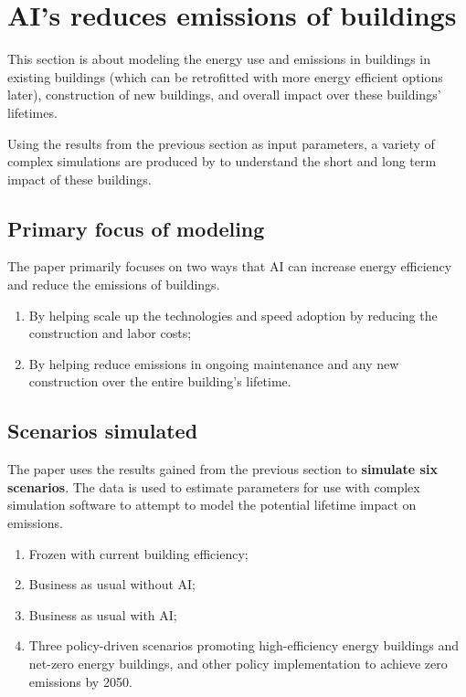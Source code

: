 \documentclass[conference,a4paper]{IEEEtran}
\begin{document}
\section*{AI's reduces emissions of buildings}

This section is about modeling the energy use and emissions in buildings in existing buildings (which can be retrofitted with more energy efficient options later), construction of new buildings, and overall impact over these buildings' lifetimes.

Using the results from the previous section as input parameters, a variety of complex simulations are produced by to understand the short and long term impact of these buildings.

\subsection*{Primary focus of modeling}

The paper primarily focuses on two ways that AI can increase energy efficiency and reduce the emissions of buildings.

\begin{enumerate}
    \item By helping scale up the technologies and speed adoption by reducing the construction and labor costs;
    \item By helping reduce emissions in ongoing maintenance and any new construction over the entire building's lifetime.
\end{enumerate}

\subsection*{Scenarios simulated}
The paper uses the results gained from the previous section to \textbf{simulate six scenarios}. The data is used to estimate parameters for use with complex simulation software to attempt to model the potential lifetime impact on emissions.
\begin{enumerate}
    \item Frozen with current building efficiency;
    \item Business as usual without AI;
    \item Business as usual with AI;
    \item Three policy-driven scenarios promoting high-efficiency energy buildings and net-zero energy buildings, and other policy implementation to achieve zero emissions by 2050.
\end{enumerate}
\end{document}
